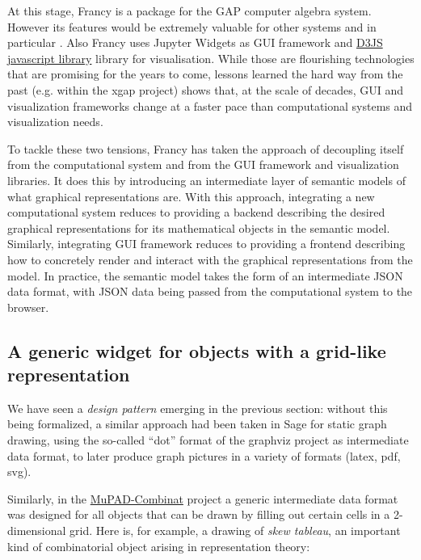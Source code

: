 \documentclass{deliverablereport}
\begin{document}

At this stage, Francy is a package for the GAP computer algebra
system. However its features would be extremely valuable for other
systems and in particular \Sage. Also Francy uses Jupyter Widgets as
GUI framework and \href{d3js.org}{D3JS javascript library} library for
visualisation. %
While those are flourishing technologies that are promising for the
years to come, lessons learned the hard way from the past (e.g. within
the xgap project) shows that, at the scale of decades, GUI and
visualization frameworks change at a faster pace than computational
systems and visualization needs.

To tackle these two tensions, Francy has taken the approach of
decoupling itself from the computational system and from the GUI
framework and visualization libraries. It does this by introducing an
intermediate layer of semantic models of what graphical
representations are. With this approach, integrating a new
computational system reduces to providing a backend describing the
desired graphical representations for its mathematical objects in the
semantic model. Similarly, integrating GUI framework reduces to
providing a frontend describing how to concretely render and interact
with the graphical representations from the model. In practice, the
semantic model takes the form of an intermediate JSON data format,
with JSON data being passed from the computational system to the
browser.




\subsection{A generic widget for objects with a grid-like representation}
\label{grid}

We have seen a \emph{design pattern} emerging in the previous section:
without this being formalized, a similar approach had been taken in
Sage for static graph drawing, using the so-called ``dot'' format of
the graphviz project as intermediate data format, to later produce
graph pictures in a variety of formats (latex, pdf, svg).

Similarly, in the
\href{http://mupad-combinat.sourceforge.net}{MuPAD-Combinat} project a
generic intermediate data format was designed for all objects that can be
drawn by filling out certain cells in a 2-dimensional grid. Here is,
for example, a drawing of \emph{skew tableau}, an important kind of
combinatorial object arising in representation theory:
\end{document}

